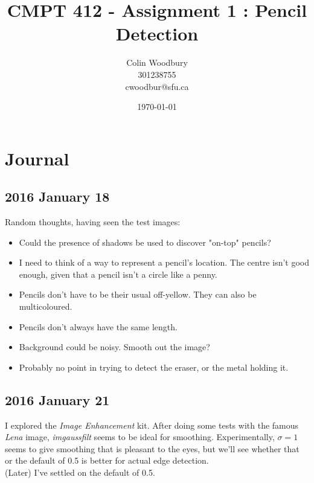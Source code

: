 \documentclass{article}
\begin{document}
\title{CMPT 412 - Assignment 1 : Pencil Detection}
\author{Colin Woodbury\\ 301238755\\ cwoodbur@sfu.ca}
\date{\today}
\maketitle

\tableofcontents
\clearpage

\section{Journal}
\subsection{2016 January 18}
Random thoughts, having seen the test images:
\begin{itemize}
\item Could the presence of shadows be used to discover "on-top" pencils?
\item I need to think of a way to represent a pencil's location. The centre
  isn't good enough, given that a pencil isn't a circle like a penny.
\item Pencils don't have to be their usual off-yellow. They can also be
  multicoloured.
\item Pencils don't always have the same length.
\item Background could be noisy. Smooth out the image?
\item Probably no point in trying to detect the eraser, or the metal holding it.
\end{itemize}

\subsection{2016 January 21}
I explored the \emph{Image Enhancement} kit. After doing some tests with the
famous \emph{Lena} image, \emph{imgaussfilt} seems to be ideal for smoothing.
Experimentally, $\sigma = 1$ seems to give smoothing that is pleasant to the
eyes, but we'll see whether that or the default of 0.5 is better for actual
edge detection.\\

(Later) I've settled on the default of 0.5.
\end{document}

